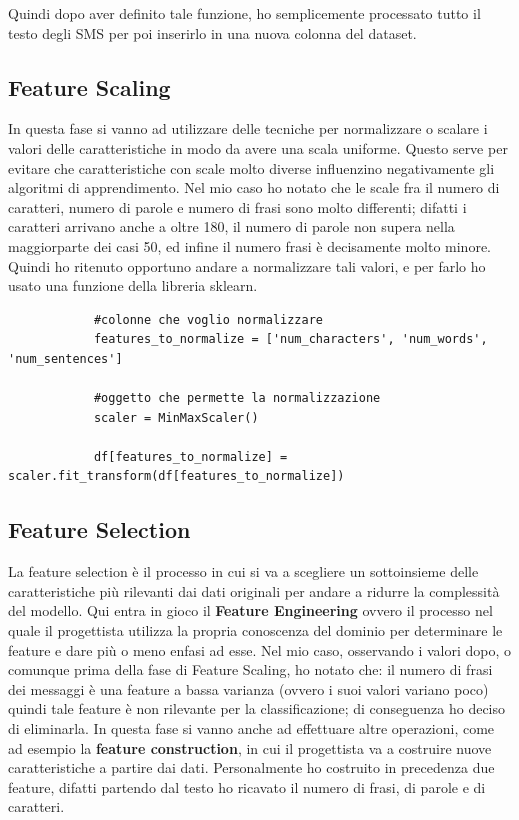 \documentclass[]{article}
\begin{document}
        Quindi dopo aver definito tale funzione, ho semplicemente processato tutto il testo degli SMS per poi inserirlo in una nuova colonna del dataset.

    \subsection{Feature Scaling}
        In questa fase si vanno ad utilizzare delle tecniche per normalizzare o scalare i valori delle caratteristiche in modo da avere una scala uniforme. Questo serve per evitare che caratteristiche con scale molto diverse influenzino negativamente gli algoritmi di apprendimento. Nel mio caso ho notato che le scale fra il numero di caratteri, numero di parole e numero di frasi sono molto differenti; difatti i caratteri arrivano anche a oltre 180, il numero di parole non supera nella maggiorparte dei casi 50, ed infine il numero frasi è decisamente molto minore. Quindi ho ritenuto opportuno andare a normalizzare tali valori, e per farlo ho usato una funzione della libreria sklearn.
        \begin{verbatim}
            #colonne che voglio normalizzare
            features_to_normalize = ['num_characters', 'num_words', 'num_sentences']

            #oggetto che permette la normalizzazione
            scaler = MinMaxScaler()

            df[features_to_normalize] = scaler.fit_transform(df[features_to_normalize])
        \end{verbatim}

        \subsection{Feature Selection}
            La feature selection è il processo in cui si va a scegliere un sottoinsieme delle caratteristiche più rilevanti dai dati originali per andare a ridurre la complessità del modello. Qui entra in gioco il \textbf{Feature Engineering} ovvero il processo nel quale il progettista utilizza la propria conoscenza del dominio per determinare le feature e dare più o meno enfasi ad esse. Nel mio caso, osservando i valori dopo, o comunque prima della fase di Feature Scaling, ho notato che: il numero di frasi dei messaggi è una feature a bassa varianza (ovvero i suoi valori variano poco) quindi tale feature è non rilevante per la classificazione; di conseguenza ho deciso di eliminarla. In questa fase si vanno anche ad effettuare altre operazioni, come ad esempio la \textbf{feature construction}, in cui il progettista va a costruire nuove caratteristiche a partire dai dati. Personalmente ho costruito in precedenza due feature, difatti partendo dal testo ho ricavato il numero di frasi, di parole e di caratteri.
\end{document}
